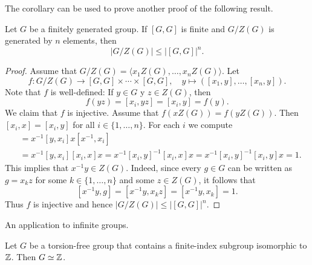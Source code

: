 The corollary can be used to prove another proof of
the following result. 

\begin{theorem}
	Let $G$ be a finitely generated group. If $[G,G]$ is finite and $G/Z(G)$ is generated by
	$n$ elements, then  
	\[
	|G/Z(G)|\leq |[G,G]|^n. 
	\]
\end{theorem}

\begin{proof}
	Assume that $G/Z(G)=\langle x_1Z(G),\dots,x_nZ(G)\rangle$. Let 
	\[
		f\colon G/Z(G)\to [G,G]\times\cdots\times [G,G],
		\quad
		y\mapsto ([x_1,y],\dots,[x_n,y]).
	\]
	Note that $f$ is well-defined: If $y\in G$ y $z\in Z(G)$, then 
	\[
		f(yz)=[x_i,yz]=[x_i,y]=f(y). 
	\]
	We claim that $f$ is injective. Assume that $f(xZ(G))=f(yZ(G))$. Then 
	$[x_i,x]=[x_i,y]$ for all $i\in\{1,\dots,n\}$. For each $i$ we compute  
	\begin{align*}
		[x^{-1}y,x_i] &= x^{-1}[y,x_i]x[x^{-1},x_i]\\
		&=x^{-1}[y,x_i][x_i,x]x=x^{-1}[x_i,y]^{-1}[x_i,x]x=x^{-1}[x_i,y]^{-1}[x_i,y]x=1.
	\end{align*}
	This implies that $x^{-1}y\in Z(G)$. Indeed, since  
	every $g\in G$ can be written as $g=x_kz$ for some $k\in\{1,\dots,n\}$ and some $z\in Z(G)$, 
	it follows that 
    \[
    [x^{-1}y,g]=[x^{-1}y,x_kz]=[x^{-1}y,x_k]=1.
    \]
    Thus $f$ is injective and hence
	$|G/Z(G)|\leq |[G,G]|^n$. 
\end{proof}

An application to infinite groups. 

\begin{theorem}
	Let $G$ be a torsion-free group that contains a finite-index subgroup isomorphic to  
	$\mathbb{Z}$. Then $G\simeq\mathbb{Z}$.
\end{theorem}

